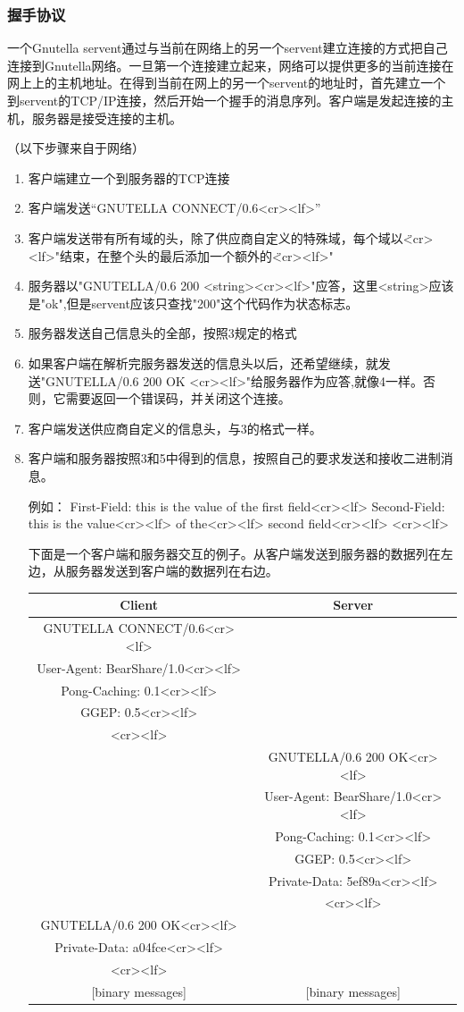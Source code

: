 \documentclass{ctexart}
\begin{document}
\subsubsection{握手协议}
一个Gnutella servent通过与当前在网络上的另一个servent建立连接的方式把自己连接到Gnutella网络。一旦第一个连接建立起来，网络可以提供更多的当前连接在网上上的主机地址。在得到当前在网上的另一个servent的地址时，首先建立一个到servent的TCP/IP连接，然后开始一个握手的消息序列。客户端是发起连接的主机，服务器是接受连接的主机。

（以下步骤来自于网络）
\begin{enumerate}
	\item 客户端建立一个到服务器的TCP连接
	\item 客户端发送“GNUTELLA CONNECT/0.6<cr><lf>”
	\item 客户端发送带有所有域的头，除了供应商自定义的特殊域，每个域以\"<cr><lf>"结束，在整个头的最后添加一个额外的\"<cr><lf>"
	\item 服务器以"GNUTELLA/0.6 200 <string><cr><lf>"应答，这里<string>应该是"ok",但是servent应该只查找"200"这个代码作为状态标志。
	\item 服务器发送自己信息头的全部，按照3规定的格式
	\item 如果客户端在解析完服务器发送的信息头以后，还希望继续，就发送"GNUTELLA/0.6 200 OK <cr><lf>"给服务器作为应答,就像4一样。否则，它需要返回一个错误码，并关闭这个连接。
	\item 客户端发送供应商自定义的信息头，与3的格式一样。
	\item 客户端和服务器按照3和5中得到的信息，按照自己的要求发送和接收二进制消息。
	
	例如：
	First-Field: this is the value of the first field<cr><lf>
	Second-Field: this is the value<cr><lf>
	of the<cr><lf>
	second field<cr><lf>
	<cr><lf>
	
	下面是一个客户端和服务器交互的例子。从客户端发送到服务器的数据列在左边，从服务器发送到客户端的数据列在右边。
	
	\begin{tabular}{cc}
		\hline
		Client                          &Server\\\hline
		GNUTELLA CONNECT/0.6<cr><lf>& \\
		User-Agent: BearShare/1.0<cr><lf>& \\
		Pong-Caching: 0.1<cr><lf>& \\
		GGEP: 0.5<cr><lf>& \\
		<cr><lf>& \\
		&GNUTELLA/0.6 200 OK<cr><lf> \\
		&User-Agent: BearShare/1.0<cr><lf> \\
		&Pong-Caching: 0.1<cr><lf> \\
		&GGEP: 0.5<cr><lf> \\
		&Private-Data: 5ef89a<cr><lf> \\
		&<cr><lf> \\
		GNUTELLA/0.6 200 OK<cr><lf>& \\
		Private-Data: a04fce<cr><lf>& \\
		<cr><lf>& \\
		{[binary messages]}&{[binary messages]} \\ 
	\end{tabular}
\end{enumerate}
\end{document}
